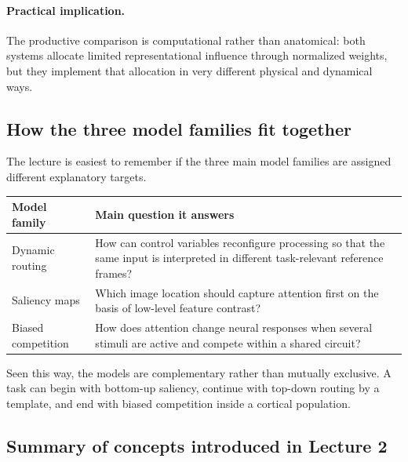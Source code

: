 \paragraph{Practical implication.}
The productive comparison is computational rather than anatomical: both systems allocate limited representational influence through normalized weights, but they implement that allocation in very different physical and dynamical ways.

\subsection{How the three model families fit together}

The lecture is easiest to remember if the three main model families are assigned different explanatory targets.

\begin{center}
\begin{tabular}{lp{}}
\hline
Model family & Main question it answers \\
\hline
Dynamic routing & How can control variables reconfigure processing so that the same input is interpreted in different task-relevant reference frames? \\
Saliency maps & Which image location should capture attention first on the basis of low-level feature contrast? \\
Biased competition & How does attention change neural responses when several stimuli are active and compete within a shared circuit? \\
\hline
\end{tabular}
\end{center}

Seen this way, the models are complementary rather than mutually exclusive. A task can begin with bottom-up saliency, continue with top-down routing by a template, and end with biased competition inside a cortical population.

\subsection{Summary of concepts introduced in Lecture 2}

